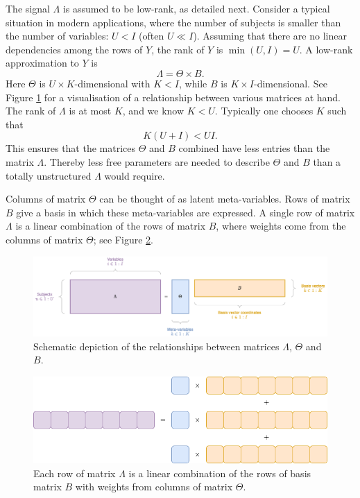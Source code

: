 \documentclass[]{article}
\begin{document}
The signal $\Lambda$ is assumed to be low-rank, as detailed next. Consider a typical situation in modern applications, where the number of subjects is smaller than the number of variables: $U < I$ (often $U \ll I$). Assuming that there are no linear dependencies among the rows of $Y$, the rank of $Y$ is $\min(U, I) = U$. A low-rank approximation to $Y$ is
\begin{equation}
\label{factorisation}
\Lambda = \Theta \times B.
\end{equation}
Here $\Theta$ is $U \times K$-dimensional with $K < I$, while $B$ is $K \times I$-dimensional. See Figure \ref{fig:nmf} for a visualisation of a relationship between various matrices at hand. The rank of $\Lambda$ is at most $K$, and we know $K < U$. Typically one chooses $K$ such that
\[
K  (U + I) < U  I.
\]
This ensures that the matrices $\Theta$ and $B$ combined have less entries than the matrix $\Lambda$. Thereby less free parameters are needed to describe $\Theta$ and $B$ than a totally unstructured $\Lambda$ would require.

Columns of matrix $\Theta$ can be thought of as latent meta-variables. Rows of matrix $B$ give a basis in which these meta-variables are expressed. A single row of matrix $\Lambda$ is a linear combination of the rows of matrix $B$, where weights come from the columns of matrix $\Theta$; see Figure \ref{fig:nmf3}.

\begin{figure}[h]
	\centering
	\includegraphics[width=12cm]{NMF.png}
	\caption{Schematic depiction of the relationships between matrices $\Lambda$, $\Theta$ and $B$.}
	\label{fig:nmf}
\end{figure}

\begin{figure}[h]
	\centering
	\includegraphics[width=12cm]{NMF3.png}
	\caption{Each row of matrix $\Lambda$ is a linear combination of the rows of basis matrix $B$ with weights from columns of matrix $\Theta$.}
	\label{fig:nmf3}
\end{figure}
\end{document}
